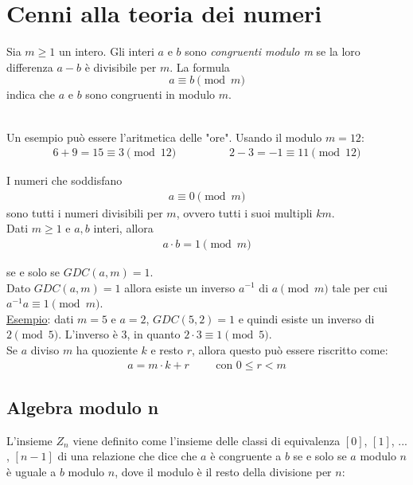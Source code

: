 \setchapterpreamble[u]{\margintoc}
\chapter{Cenni alla teoria dei numeri}

\begin{definition}
Sia \(m \ge 1\) un intero. Gli interi \(a\) e \(b\) sono \textit{congruenti modulo m} se la loro differenza \(a-b\) è divisibile per \(m\). La formula 
\[a \equiv b \pmod m\]
indica che \(a\) e \(b\) sono congruenti in modulo \(m\).
\end{definition}

\noindent\\ Un esempio può essere l'aritmetica delle "ore". Usando il modulo $m = 12$:
\begin{align*}
    6+9=15 \equiv 3 \pmod{12} \hspace{2cm} 2-3=-1 \equiv 11 \pmod{12}
\end{align*}

\noindent I numeri che soddisfano 
\begin{align*}
    a \equiv 0 \pmod m
\end{align*}
\noindent sono tutti i numeri divisibili per $m$, ovvero tutti i suoi multipli $km$.\\

\noindent Dati $m \ge 1$ e $a, b$ interi, allora
\begin{align*}
    a \cdot b = 1 \pmod m
\end{align*}

\noindent se e solo se $GDC(a, m) = 1$.\\

\noindent Dato $GDC(a, m) = 1$ allora esiste un inverso $a^{-1}$ di $a \pmod m$ tale per cui $a^{-1}a \equiv 1 \pmod m$. \\

\noindent \underline{Esempio}: dati $m = 5$ e $a = 2$, $GDC(5, 2) = 1$ e quindi esiste un inverso di $2 \pmod 5$. L'inverso è $3$, in quanto $2\cdot 3 \equiv 1 \pmod 5$.
\\

\noindent Se $a$ diviso $m$ ha quoziente $k$ e resto $r$, allora questo può essere riscritto come:
\begin{align*}
    a = m \cdot k + r \hspace{1cm} \text{con } 0 \le r < m
\end{align*}

\section{Algebra modulo n}
L'insieme $Z_n$ viene definito come l'insieme delle classi di equivalenza $[0]$, $[1]$, $...$, $[n-1]$ di una relazione che dice che ${a}$ è congruente a ${b}$ se e solo se ${a}$ modulo $n$ è uguale a ${b}$ modulo ${n}$, dove il modulo è il resto della divisione per ${n}$:

